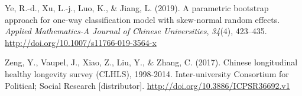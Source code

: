 \documentclass[12pt, twoside]{amherstthesis}
\begin{document}
\leavevmode\hypertarget{ref-ye_parametric_2019}{}%
Ye, R.-d., Xu, L.-j., Luo, K., \& Jiang, L. (2019). A parametric bootstrap approach for one-way classification model with skew-normal random effects. \emph{Applied Mathematics-A Journal of Chinese Universities}, \emph{34}(4), 423--435. \url{http://doi.org/10.1007/s11766-019-3564-x}

\leavevmode\hypertarget{ref-zeng_chinese_2017}{}%
Zeng, Y., Vaupel, J., Xiao, Z., Liu, Y., \& Zhang, C. (2017). Chinese longitudinal healthy longevity survey (CLHLS), 1998-2014. Inter-university Consortium for Political; Social Research {[}distributor{]}. \url{http://doi.org/10.3886/ICPSR36692.v1}

\end{document}
